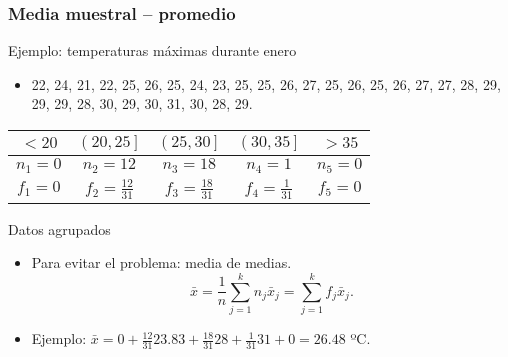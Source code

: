 \documentclass[table]{beamer}
\begin{document}
\begin{frame}
    \frametitle{Media muestral -- promedio}
    \begin{exampleblock}{Ejemplo: temperaturas máximas durante enero}
        \begin{itemize}
            \item 22, 24, 21, 22, 25, 26, 25, 24, 23, 25, 25, 26, 27, 25, 26, 25, 26, 27, 27, 28, 29, 29, 29, 28, 30, 29, 30, 31, 30, 28, 29.
        \end{itemize}
        \begin{center}
            \begin{tabular}{c|c|c|c|c}
                $< 20$ & $\left ( 20 , 25 \right ]$ & $\left ( 25 , 30 \right ]$ & $\left ( 30 , 35 \right ]$ & $> 35$ \\
                \hline
                $n_{1} = 0$ & $n_{2} = 12$ & $n_{3} = 18$ & $n_{4} = 1$ & $n_{5} = 0$ \\
                \hline
                $f_{1} = 0$ & $f_{2} = \frac{12}{31}$ & $f_{3} = \frac{18}{31}$ & $f_{4} = \frac{1}{31}$ & $f_{5} = 0$ \\
            \end{tabular}
        \end{center}
    \end{exampleblock}
    \begin{block}{Datos agrupados}
        \begin{itemize}
            \item Para evitar el problema: media de medias.
                \begin{equation*}
                    \bar{x} = \frac{1}{n} \sum_{j = 1}^{k} n_{j} \bar{x}_{j} = \sum_{j = 1}^{k} f_{j} \bar{x}_{j} .
                \end{equation*}
            \item Ejemplo: $\bar{x} = 0 + \frac{12}{31} 23.83 + \frac{18}{31} 28 + \frac{1}{31} 31 + 0 = 26.48$ ºC.
        \end{itemize}
    \end{block}
\end{frame}
\end{document}
